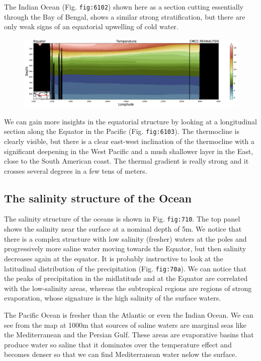 The Indian Ocean (Fig. \texttt{fig:6102}) shown here as a section
cutting essentially through the Bay of Bengal, shows a similar strong
stratification, but there are only weak signs of an equatorial upwelling
of cold water.

\begin{figure}
	\centering
	\includegraphics[width = .7 \textwidth]{figs/GD/SectEquator1000.png}
	\caption{} \label{fig:}
\end{figure}

We can gain more insights in the equatorial structure by looking at a
longitudinal section along the Equator in the Pacific (Fig.
\texttt{fig:6103}). The thermocline is clearly visible, but there is a
clear east-west inclination of the thermocline with a significant
deepening in the West Pacific and a mush shallower layer in the East,
close to the South American coast. The thermal gradient is really strong
and it crosses several degrees in a few tens of meters.

\subsection{The salinity structure of the
	Ocean}\label{the-salinity-structure-of-the-ocean}

The salinity structure of the oceans is shown in Fig. \texttt{fig:710}.
The top panel shows the salinity near the surface at a nominal depth of
5m. We notice that there is a complex structure with low salinity
(fresher) waters at the poles and progressively more saline water moving
towards the Equator, but then salinity decreases again at the equator.
It is probably instructive to look at the latitudinal distribution of
the precipitation (Fig. \texttt{fig:70a}). We can notice that the peaks
of precipitation in the midlatitude and at the Equator are correlated
with the low-salinity areas, whereas the subtropical regions are regions
of strong evaporation, whose signature is the high salinity of the
surface waters.

The Pacific Ocean is fresher than the Atlantic or even the Indian Ocean.
We can see from the map at 1000m that sources of saline waters are
marginal seas like the Mediterranean and the Persian Gulf. These areas
are evaporative basins that produce water so saline that it dominates
over the temperature effect and becomes denser so that we can find
Mediterranean water nelow the surface.

